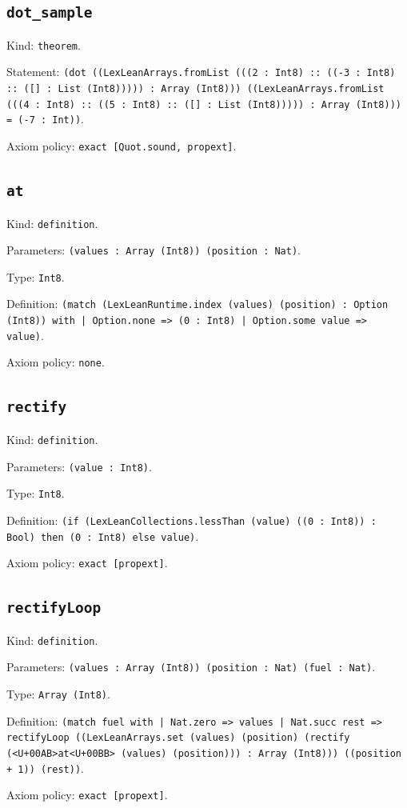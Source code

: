 \documentclass[11pt]{article}
\begin{document}
\subsection*{\texttt{dot\_sample}}
\noindent Kind: \texttt{theorem}.\par
\noindent Statement: \texttt{(dot ((LexLeanArrays.fromList (((2 : Int8) :: ((-3 : Int8) :: ([] : List (Int8))))) : Array (Int8))) ((LexLeanArrays.fromList (((4 : Int8) :: ((5 : Int8) :: ([] : List (Int8))))) : Array (Int8))) = (-7 : Int))}.\par
\noindent Axiom policy: \texttt{exact [Quot.sound, propext]}.\par
\subsection*{\texttt{at}}
\noindent Kind: \texttt{definition}.\par
\noindent Parameters: \texttt{(values : Array (Int8)) (position : Nat)}.\par
\noindent Type: \texttt{Int8}.\par
\noindent Definition: \texttt{(match (LexLeanRuntime.index (values) (position) : Option (Int8)) with | Option.none => (0 : Int8) | Option.some value => value)}.\par
\noindent Axiom policy: \texttt{none}.\par
\subsection*{\texttt{rectify}}
\noindent Kind: \texttt{definition}.\par
\noindent Parameters: \texttt{(value : Int8)}.\par
\noindent Type: \texttt{Int8}.\par
\noindent Definition: \texttt{(if (LexLeanCollections.lessThan (value) ((0 : Int8)) : Bool) then (0 : Int8) else value)}.\par
\noindent Axiom policy: \texttt{exact [propext]}.\par
\subsection*{\texttt{rectifyLoop}}
\noindent Kind: \texttt{definition}.\par
\noindent Parameters: \texttt{(values : Array (Int8)) (position : Nat) (fuel : Nat)}.\par
\noindent Type: \texttt{Array (Int8)}.\par
\noindent Definition: \texttt{(match fuel with | Nat.zero => values | Nat.succ rest => rectifyLoop ((LexLeanArrays.set (values) (position) (rectify (<U+00AB>at<U+00BB> (values) (position))) : Array (Int8))) ((position + 1)) (rest))}.\par
\noindent Axiom policy: \texttt{exact [propext]}.\par
\end{document}
